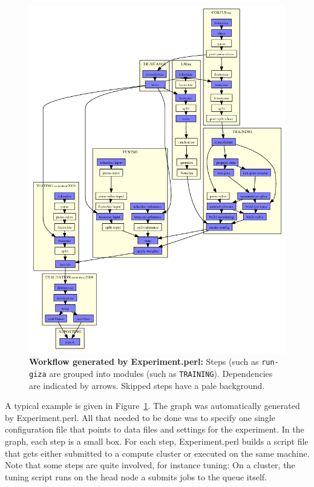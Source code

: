 \documentclass{pbml}
\begin{document}
\begin{figure}
\begin{center}
\includegraphics[scale=0.45]{ems-agenda.png}
\end{center}
\caption{{\bf Workflow generated by Experiment.perl:} Steps (such as {\tt run-giza} are grouped into modules (such as {\tt TRAINING}). Dependencies are indicated by arrows. Skipped steps have a pale background.}
\label{ems-agenda}
\end{figure}

A typical example is given in Figure~\ref{ems-agenda}.
The graph was automatically generated by Experiment.perl. All that needed to be done was to specify one single configuration file that points to data files and settings for the experiment.
In the graph, each step is a small box. For each step, Experiment.perl builds a script file that gets either submitted to a compute cluster or executed on the same machine. Note that some steps are quite involved, for instance tuning: On a cluster, the tuning script runs on the head node a submits jobs to the queue itself.
\end{document}
